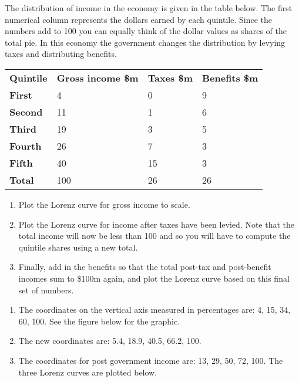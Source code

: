 \begin{enumialphparenastyle}
\begin{ex}\label{ex:ch13ex7}
The distribution of income in the economy is given in the table below. The first numerical column represents the dollars earned by each quintile. Since the numbers add to 100 you can equally think of the dollar values as shares of the total pie. In this economy the government changes the distribution by levying taxes and distributing benefits.
\begin{center}
\begin{tabu} to \linewidth {|X[0.5,c]X[1,c]X[1,c]X[1,c]|}	\hline
{}	\textbf{Quintile}	&	\textbf{Gross income \$m}	&	\textbf{Taxes \$m}	&	\textbf{Benefits \$m}	\\
						\textbf{First}		&	4							&	0					&	9						\\
	\textbf{Second}		&	11							&	1					&	6						\\
						\textbf{Third}		&	19							&	3					&	5						\\
	\textbf{Fourth}		&	26							&	7					&	3						\\
						\textbf{Fifth}		&	40							&	15					&	3						\\
	\textbf{Total}		&	100							&	26					&	26						\\	\hline
\end{tabu}
\end{center}
\begin{enumerate}
	\item	Plot the Lorenz curve for gross income to scale.
	\item	Plot the Lorenz curve for income after taxes have been levied. Note that the total income will now be less than 100 and so you will have to compute the quintile shares using a new total.
	\item	Finally, add in the benefits so that the total post-tax and post-benefit incomes sum to \$100m again, and plot the Lorenz curve based on this final set of numbers.
\end{enumerate}
\begin{sol}
\begin{enumerate}
	\item	The coordinates on the vertical axis measured in percentages are: 4, 15, 34, 60, 100. See the figure below for the graphic.
	\item	The new coordinates are: 5.4, 18.9, 40.5, 66.2, 100.
	\item	The coordinates for post government income are: 13, 29, 50, 72, 100. The three Lorenz curves are plotted below.

\end{enumerate}
\end{sol}
\end{ex}
\end{enumialphparenastyle}
